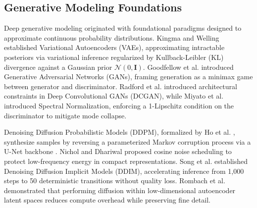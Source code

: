 \documentclass[conference]{IEEEtran}
\begin{document}
\subsection{Generative Modeling Foundations}
Deep generative modeling originated with foundational paradigms designed to approximate continuous probability distributions. Kingma and Welling \cite{kingma2014vae} established Variational Autoencoders (VAEs), approximating intractable posteriors via variational inference regularized by Kullback-Leibler (KL) divergence against a Gaussian prior $\mathcal{N}(0, \mathbf{I})$. Goodfellow et al. \cite{goodfellow2014gan} introduced Generative Adversarial Networks (GANs), framing generation as a minimax game between generator and discriminator. Radford et al. \cite{radford2016dcgan} introduced architectural constraints in Deep Convolutional GANs (DCGAN), while Miyato et al. \cite{miyato2018spectral} introduced Spectral Normalization, enforcing a 1-Lipschitz condition on the discriminator to mitigate mode collapse.

Denoising Diffusion Probabilistic Models (DDPM), formalized by Ho et al. \cite{ho2020ddpm}, synthesize samples by reversing a parameterized Markov corruption process via a U-Net backbone \cite{ronneberger2015unet}. Nichol and Dhariwal \cite{nichol2021improved} proposed cosine noise scheduling to protect low-frequency energy in compact representations. Song et al. \cite{song2021ddim} established Denoising Diffusion Implicit Models (DDIM), accelerating inference from 1,000 steps to 50 deterministic transitions without quality loss. Rombach et al. \cite{rombach2022latent} demonstrated that performing diffusion within low-dimensional autoencoder latent spaces reduces compute overhead while preserving fine detail.
\end{document}
